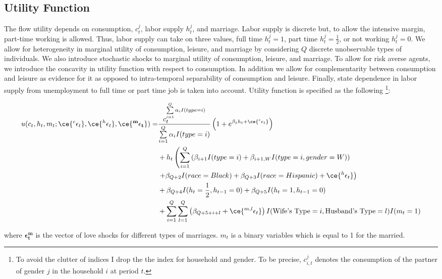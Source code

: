 \subsection{Utility Function}
The flow utility depends on consumption, $c_t^j$, labor supply $h_t^j$, and marriage. Labor supply is discrete but, to allow the intensive margin, part-time working is allowed. Thus, labor supply can take on three values, full time $h_t^j = 1$,  part time $h_t^j = \frac{1}{2}$, or not working $h_t^j = 0$. We allow for heterogeneity in marginal utility of consumption, leisure, and marriage by considering $Q$ discrete  unobservable types of individuals. We also introduce stochastic shocks to  marginal utility of consumption, leisure, and marriage. To allow for risk averse agents, we introduce the concavity in utility function with respect to consumption. In addition we allow for complementarity between consumption and leisure as evidence for it as opposed to intra-temporal separability of consumption and leisure. Finally, state dependence in labor supply from unemployment to full time or part time job is taken into account.  Utility function is specified as the following \footnote {To avoid the clutter of indices I drop the the index for household and gender. To be precise, $c^j_{i,t}$ denotes the consumption of the partner of gender $j$ in the household $i$ at period $t$. }:
  
\begin{align*}
 u(c_{t}, h_{t}, m_{t}; \ce{^{c}\epsilon_{t}}, \ce{^{h}\epsilon_t}, \ce{^{\mathbf{m}}\mathbf{\epsilon_t}}) = & \dfrac{c_t^{\sum \limits_ {i=1}^{Q} \alpha_iI(type = i)}}{{\sum \limits_ {i=1}^{Q} \alpha_iI(type = i)}} \left (1 + e^{\beta_1 h_t+\ce{^c\epsilon_t}} \right ) \\
& + h_t \left( \sum \limits_{i=1}^{Q} \left( \beta_{i+1} I(type =i) + \beta_{i+1,W}  I(type = i, gender = W)\right) \right. \\
& \left.  + \beta_{Q+2} I(race = Black) + \beta_{Q+3} I(race = Hispanic) +\ce{^h\epsilon_t}  \right) \\
& + \beta_{Q+4} I(h_t =\frac{1}{2}, h_{t-1} = 0) + \beta_{Q+5} I(h_t = 1, h_{t-1} = 0) \\
& + \sum \limits_{i=1}^{Q} \sum \limits_{l=1}^{Q} \left( \beta_{Q+5+i+l} + \ce{^{m,l}\epsilon_t}\right ) I(\text{Wife's Type} = i, \text{Husband's Type} = l) I(m_t = 1)
\end{align*}


where $\mathbf {\epsilon_t^m}$ is the vector of love shocks for different types of marriages. $m_t$ is a binary variables which is equal to 1 for the married. 

